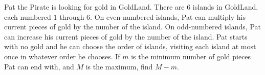 Pat the Pirate is looking for gold in GoldLand. There are $6$ islands in GoldLand, each numbered $1$ through $6$. On even-numbered islands, Pat can multiply his current pieces of gold by the number of the island. On odd-numbered islands, Pat can increase his current pieces of gold by the number of the island. Pat starts with no gold and he can choose the order of islands, visiting each island at most once in whatever order he chooses. If $m$ is the minimum number of gold pieces Pat can end with, and $M$ is the maximum, find $M -m$.
